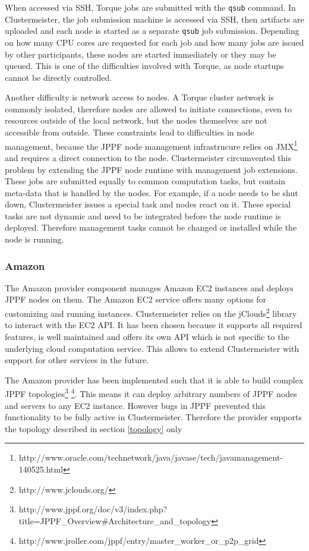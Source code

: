 \documentclass[12pt]{article}
\begin{document}
When accessed via SSH, Torque jobs are submitted with the \texttt{qsub} command. In Clustermeister, the job submission machine is accessed via SSH, then artifacts are uploaded and each node is started as a separate \texttt{qsub} job submission. Depending on how many CPU cores are requested for each job and how many jobs are issued by other participants, these nodes are started immediately or they may be queued. This is one of the difficulties involved with Torque, as node startups cannot be directly controlled.

Another difficulty is network access to nodes. A Torque cluster network is commonly isolated, therefore nodes are allowed to initiate connections, even to resources outside of the local network, but the nodes themselves are not accessible from outside. These constraints lead to difficulties in node management, because the JPPF node management infrastrucure relies on JMX\footnote{http://www.oracle.com/technetwork/java/javase/tech/javamanagement-140525.html} and requires a direct connection to the node. Clustermeister circumvented this problem by extending the JPPF node runtime with management job extensions. These jobs are submitted equally to common computation tasks, but contain meta-data that is handled by the nodes. For example, if a node needs to be shut down, Clustermeister issues a special task and nodes react on it. These special tasks are not dynamic and need to be integrated before the node runtime is deployed. Therefore management tasks cannot be changed or installed while the node is running.

\subsubsection{Amazon}
The Amazon provider component manages Amazon EC2 instances and deploys JPPF nodes on them. The Amazon EC2 service offers many options for customizing and running instances. Clustermeister relies on the jClouds\footnote{http://www.jclouds.org/} library to interact with the EC2 API. It has been chosen because it supports all required features, is well maintained and offers its own API which is not specific to the underlying cloud computation service. This allows to extend Clustermeister with support for other services in the future.

The Amazon provider has been implemented such that it is able to build complex JPPF topologies\footnote{http://www.jppf.org/doc/v3/index.php?title=JPPF\_Overview\#Architecture\_and\_topology} \footnote{http://www.jroller.com/jppf/entry/master\_worker\_or\_p2p\_grid}. This means it can deploy arbitrary numbers of JPPF nodes and servers to any EC2 instance. However bugs in JPPF prevented this functionality to be fully active in Clustermeister. Therefore the provider supports the topology described in section \ref{topology} only
\end{document}
